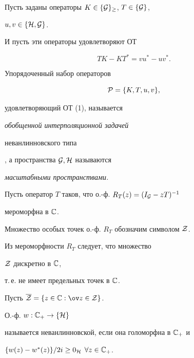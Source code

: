 Пусть заданы операторы $K\in \{ {\cal G} \}_\ge$, $T\in \{{\cal G}\}$,


$u,v\in \{{\cal H},{\cal G}\}$.


И пусть эти операторы удовлетворяют ОТ


\begin{equation}


TK-KT^*=vu^*-uv^*.


\end{equation}





\begin{defn}


Упорядоченный набор операторов


\begin{equation}


{\cal P} = \{ K,T,u,v \},


\end{equation}


удовлетворяющий ОТ (1), называется {\it обобщенной интерполяционной задачей


неванлинновского типа}, а пространства ${\cal G}, {\cal H}$ называются


{\it масштабными пространствами.}


\end{defn}





Пусть оператор $T$ таков, что о.-ф. $R_{T}(z)=(I_{\cal G}-zT)^{-1}$


мероморфна в $ {\Bbb C}$.


Множество особых точек о.-ф. $R_{T}$ обозначим символом ${\cal Z}$.


Из мероморфности $R_{T}$ следует, что множество


${\cal Z}$ дискретно в $ {\Bbb C}$,


т.\,е. не имеет предельных точек в ${\Bbb C}$.


Пусть $\overline {\cal Z} = \{z\in {\Bbb C}:\ov z \in {\cal Z} \}$.





\begin{defn}


О.-ф. $w:{\Bbb C}_+\to \{ {\cal H}\}$


называется неванлинновской, если она голоморфна в ${\Bbb C}_+$ и


$\{w(z)-w^*(z)\}/2i\geq 0_{\cal H}$ $\forall z\in {\Bbb C}_+$.


\end{defn}






